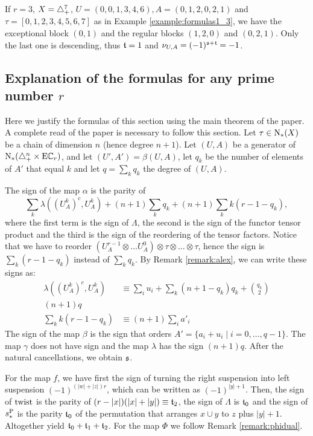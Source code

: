 \begin{example}
	If $r=3$, $X= \triangle_{+}^7$, $U = (0,0,1,3,4,6), A = (0,1,2,0,2,1)$ and $\tau = [0,1,2,3,4,5,6,7]$ as in Example \ref{example:formulas1_3}, we have the exceptional block $(0,1)$ and the regular blocks $(1,2,0)$ and $(0,2,1)$. Only the last one is descending, thus $\mathfrak{t} = 1$ and $\nu_{U,A} = (-1)^{\mathfrak{s}+\mathfrak{t}} = -1$.
\end{example}

\subsection{Explanation of the formulas for any prime number \texorpdfstring{$r$}{r}} Here we justify the formulas of this section using the main theorem of the paper. A complete read of the paper is necessary to follow this section. Let $\tau\in \operatorname{N}_{*}(X)$ be a chain of dimension $n$ (hence degree $n+1$). Let $(U,A)$ be a generator of $\operatorname{N}_{*}(\triangle_{+}^n\times \mathrm{E}\mathbb{C}_r)$, and let $(U',A') = \beta(U,A)$, let $q_k$ be the number of elements of $A'$ that equal $k$ and let $q = \sum_{k}q_k$ the degree of $(U,A)$.

The sign of the map $\alpha$ is the parity of
\[
	\sum_{k}\lambda((U_A^{k})^c,U_A^k) + (n+1)\sum_k q_k + (n+1)\sum_kk(r-1-q_k),
\]
where the first term is the sign of $\Lambda$, the second is the sign of the functor tensor product and the third is the sign of the reordering of the tensor factors. Notice that we have to reorder $(U^{r-1}_A\otimes \ldots U^0_A)\otimes \tau\otimes\ldots\otimes \tau$, hence the sign is $\sum_k(r-1-q_k)$ instead of $\sum_k q_k$. By Remark \ref{remark:alex}, we can write these signs as:
\begin{align}
\label{signo:lambda}	\lambda((U_A^k)^c,U^k_A) &\equiv \sum_i u_i + \sum_k(n+1-q_k)q_k + \binom{q_k}{2}
\\
\label{signo:prod} (n+1)q
\\
 \label{signo:reord} \sum_kk(r-1-q_k)&\equiv (n+1)\sum_{i} a'_i
\end{align}
The sign of the map $\beta$ is the sign that orders $A'  = \{a_i+u_i\mid i=0,\ldots,q-1\}$. The map $\gamma$ does not have sign and the map $\lambda$ has the sign $(n+1)q$. After the natural cancellations, we obtain $\mathfrak{s}$.

For the map $f$, we have first the sign of turning the right suspension into left suspension $(-1)^{(|w|+|z|)r}$, which can be written as $(-1)^{|y|+1}$. Then, the sign of $\operatorname{twist}$ is the parity of $(r-|x|)(|x|+|y|) \equiv \mathfrak{t}_2$, the sign of $\Lambda$ is $\mathfrak{t}_0$ and the sign of $s_*^{\operatorname{P}}$ is the parity $\mathfrak{t}_0$ of the permutation that arranges $x\cup y$ to $z$ plus $|y|+1$. Altogether yield $\mathfrak{t}_0+\mathfrak{t}_1+\mathfrak{t}_2$. For the map $\Phi$ we follow Remark \ref{remark:phidual}.
